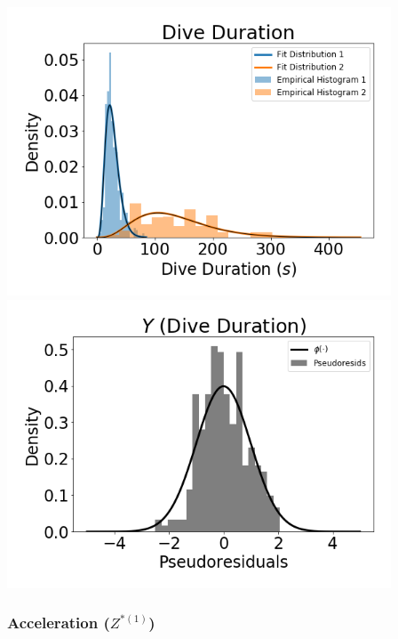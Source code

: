 \documentclass[12pt]{TD-CJS}
\begin{document}
\includegraphics[width=4.5in]{../Plots/CarHHMM1_empirical_hist_dive_duration.png}
\includegraphics[width=4.5in]{../Plots/CarHHMM1_psedoresids_Dive_Duration.png}

\newpage
\subsubsection{Acceleration ($Z^{*(1)}$)}
\end{document}
